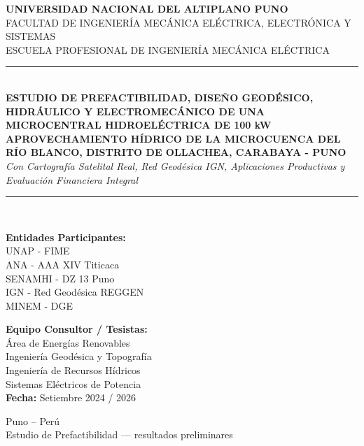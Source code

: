 \documentclass[11pt,a4paper]{report}
\begin{document}
\begin{titlepage}
\begin{center}
    \vspace*{0.3cm}
    {\Large\bfseries UNIVERSIDAD NACIONAL DEL ALTIPLANO PUNO}\\[0.4em]
    {\large FACULTAD DE INGENIERÍA MECÁNICA ELÉCTRICA, ELECTRÓNICA Y SISTEMAS}\\[0.3em]
    {\normalsize ESCUELA PROFESIONAL DE INGENIERÍA MECÁNICA ELÉCTRICA}\\[1.5cm]

    \rule{\linewidth}{2pt}\\[0.4cm]
    {\huge\bfseries\color{navyblue} ESTUDIO DE PREFACTIBILIDAD, DISEÑO GEODÉSICO, HIDRÁULICO Y ELECTROMECÁNICO DE UNA MICROCENTRAL HIDROELÉCTRICA DE 100 kW}\\[0.3cm]
    {\Large\bfseries APROVECHAMIENTO HÍDRICO DE LA MICROCUENCA DEL RÍO BLANCO, DISTRITO DE OLLACHEA, CARABAYA - PUNO}\\[0.3cm]
    {\large\textit{Con Cartografía Satelital Real, Red Geodésica IGN, Aplicaciones Productivas y Evaluación Financiera Integral}}\\[0.3cm]
    \rule{\linewidth}{2pt}\\[1.5cm]

    \begin{minipage}{0.48\textwidth}
        \textbf{Entidades Participantes:}\\
        UNAP - FIME\\
        ANA - AAA XIV Titicaca\\
        SENAMHI - DZ 13 Puno\\
        IGN - Red Geodésica REGGEN\\
        MINEM - DGE
    \end{minipage}
    \hfill
    \begin{minipage}{0.48\textwidth}
        \begin{flushright}
            \textbf{Equipo Consultor / Tesistas:}\\
            Área de Energías Renovables\\
            Ingeniería Geodésica y Topografía\\
            Ingeniería de Recursos Hídricos\\
            Sistemas Eléctricos de Potencia\\[0.4em]
            \textbf{Fecha:} Setiembre 2024 / 2026
        \end{flushright}
    \end{minipage}

    \vfill
    {\large Puno -- Perú}\\[0.2em]
    {\normalsize Estudio de Prefactibilidad — resultados preliminares}
\end{center}
\end{titlepage}
\end{document}
